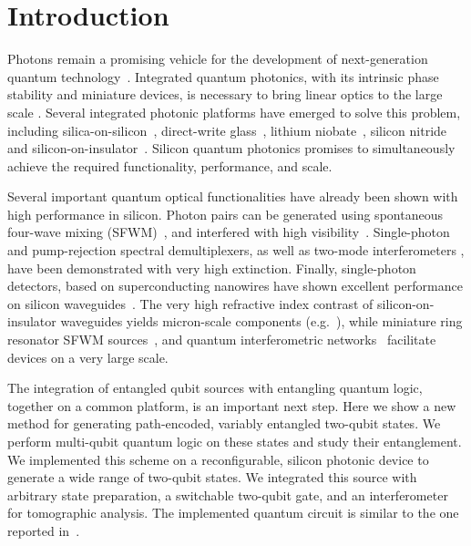 \documentclass[
twocolumn,
 amsmath,amssymb,
 aps,
  twoside,
 superscriptaddress,
pra,
longbibliography
]{revtex4-1}
\begin{document}
\maketitle



\section{Introduction}

Photons remain a promising vehicle for the development of next-generation quantum technology~\cite{Obrien:2009un, Latmiral:2016dp}. Integrated quantum photonics, with its intrinsic phase stability and miniature devices, is necessary to bring linear optics to the large scale \cite{Politi2008, Metcalf:2014jwa, Minkov:2016fm}. Several integrated photonic platforms have emerged to solve this problem, 
including silica-on-silicon~\cite{Politi2008, Matsuda:2014cy, Reimer:2015bva, Carolan:2015fb}, direct-write glass~\cite{Sansoni2010, Tillmann:2013jva, Flamini:2015cb, Bentivegna:2015iaba,Spring:2017gj}, lithium niobate~\cite{Vergyris:2016bd, Alibart:2016jo, Lenzini2017, Sansoni:2017jt}, silicon nitride~\cite{Zhang:2016dy, Moss:2013kv} and silicon-on-insulator~\cite{silverstone2016}. Silicon quantum photonics promises to simultaneously achieve the required functionality, performance, and scale.

Several important quantum optical functionalities have already been shown with high performance in silicon. Photon pairs can be generated using spontaneous four-wave mixing (SFWM)~\cite{Sharping2006,  Azzini2012, Matsuda:2012dma, Olislager2013, Collins:2013eu,  Xiong:2016bv}, and interfered with high visibility~\cite{Harada:2011cw, Silverstone:2013fu,   Takesue:2014ic, Xiong:2016bv, Xu:2013jna}. Single-photon \cite{Silverstone2015} and pump-rejection \cite{Harris2014, Piekarek:dUPyT_rs} spectral demultiplexers, as well as two-mode interferometers \cite{Wilkes:2016ba}, have been demonstrated with very high extinction. Finally, single-photon detectors, based on superconducting nanowires have shown excellent performance on silicon waveguides~\cite{Najafi2015, Pernice:2012bc}. The very high refractive index contrast of silicon-on-insulator waveguides yields micron-scale components (e.g.~\cite{Xu:2008db}), while miniature ring resonator SFWM sources~\cite{Azzini2012}, and quantum interferometric networks~\cite{Harris:2014kz} facilitate devices on a very large scale.

The integration of entangled qubit sources with entangling quantum logic, together on a common platform, is an important next step. Here we show a new method for generating path-encoded, variably entangled two-qubit states. We perform multi-qubit quantum logic on these states and study their entanglement. We implemented this scheme on a reconfigurable, silicon photonic device to generate a wide range of two-qubit states. We integrated this source with arbitrary state preparation, a switchable two-qubit gate, and an interferometer for tomographic analysis. The implemented quantum circuit is similar to the one reported in~\cite{Shadbolt2012}.
\end{document}
